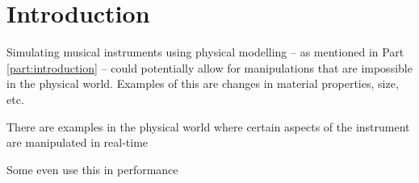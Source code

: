 \section{Introduction}\label{sec:introductionDynamic}
Simulating musical instruments using physical modelling -- as mentioned in Part \ref{part:introduction} -- could potentially allow for manipulations that are impossible in the physical world. Examples of this are changes in material properties, size, etc.  

There are examples in the physical world where certain aspects of the instrument are manipulated in real-time

Some even use this in performance \cite{Gomm2011}